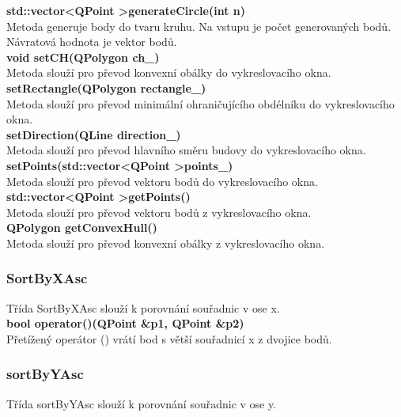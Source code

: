 \documentclass[a4paper, 12pt]{article}
\begin{document}
\textbf{std::vector\textless QPoint \textgreater generateCircle(int n)}\\
Metoda generuje body do tvaru kruhu. Na vstupu je počet generovaných bodů. Návratová hodnota je vektor bodů.\\

\textbf{void setCH(QPolygon ch\_)}\\
Metoda slouží pro převod konvexní obálky do vykreslovacího okna.\\

\textbf{setRectangle(QPolygon rectangle\_)}\\
Metoda slouží pro převod minimální ohraničujícího obdélníku do vykreslovacího okna.\\

\textbf{setDirection(QLine direction\_)}\\
Metoda slouží pro převod hlavního směru budovy do vykreslovacího okna.\\

\textbf{setPoints(std::vector\textless QPoint \textgreater points\_)}\\
Metoda slouží pro převod vektoru bodů do vykreslovacího okna.\\

\textbf{std::vector\textless QPoint \textgreater getPoints()}\\
Metoda slouží pro převod vektoru bodů z vykreslovacího okna.\\

\textbf{QPolygon getConvexHull()}\\
Metoda slouží pro převod konvexní obálky z vykreslovacího okna.

\subsubsection{SortByXAsc}
Třída SortByXAsc slouží k porovnání souřadnic v ose x.\\


\textbf{bool operator()(QPoint \&p1, QPoint \&p2)}\\
Přetížený operátor () vrátí bod s větší souřadnicí x z dvojice bodů.\\


\subsubsection{sortByYAsc}
Třída sortByYAsc slouží k porovnání souřadnic v ose y.
\\
\end{document}
